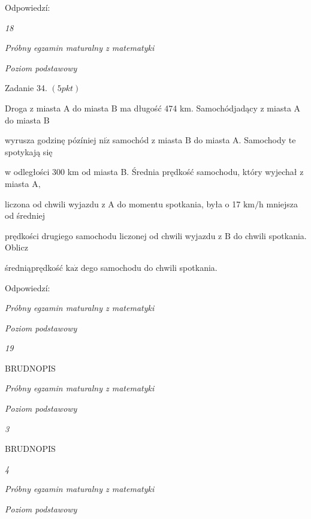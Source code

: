 \documentclass[a4paper,12pt]{article}
\begin{document}
Odpowiedzí:





{\it 18}

{\it Próbny egzamin maturalny z matematyki}

{\it Poziom podstawowy}

Zadanie 34. $(5pkt)$

Droga z miasta A do miasta $\mathrm{B}$ ma długość 474 km. Samochódjadący z miasta A do miasta $\mathrm{B}$

wyrusza godzinę pózíniej $\mathrm{n}\mathrm{i}\dot{\mathrm{z}}$ samochód z miasta $\mathrm{B}$ do miasta A. Samochody te spotykają się

w odległości 300 km od miasta B. Średnia prędkość samochodu, który wyjechał z miasta $\mathrm{A},$

liczona od chwili wyjazdu z A do momentu spotkania, była o 17 $\mathrm{k}\mathrm{m}/\mathrm{h}$ mniejsza od średniej

prędkości drugiego samochodu liczonej od chwili wyjazdu z $\mathrm{B}$ do chwili spotkania. Oblicz

średniąprędkość $\mathrm{k}\mathrm{a}\dot{\mathrm{z}}$ dego samochodu do chwili spotkania.

Odpowiedzí:





{\it Próbny egzamin maturalny z matematyki}

{\it Poziom podstawowy}

{\it 19}

BRUDNOPIS





{\it Próbny egzamin maturalny z matematyki}

{\it Poziom podstawowy}

{\it 3}

BRUDNOPIS





{\it 4}

{\it Próbny egzamin maturalny z matematyki}

{\it Poziom podstawowy}
\end{document}
